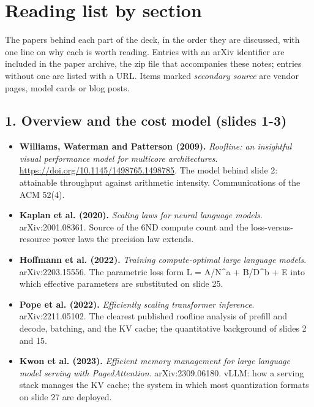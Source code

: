\documentclass[11pt,letterpaper]{article}
\begin{document}
\section{Reading list by section}
\label{app:reading}
The papers behind each part of the deck, in the order they are discussed, with one line on why each is worth reading. Entries with an arXiv identifier are included in the paper archive, the zip file that accompanies these notes; entries without one are listed with a URL. Items marked \emph{secondary source} are vendor pages, model cards or blog posts.

\subsection*{1. Overview and the cost model (slides 1-3)}
\begin{itemize}[leftmargin=1.2em,itemsep=3pt]\sloppy
\item \textbf{Williams, Waterman and Patterson (2009).} \textit{Roofline: an insightful visual performance model for multicore architectures}. \url{https://doi.org/10.1145/1498765.1498785}. The model behind slide 2: attainable throughput against arithmetic intensity. Communications of the ACM 52(4).
\item \textbf{Kaplan et al. (2020).} \textit{Scaling laws for neural language models}. arXiv:2001.08361. Source of the 6ND compute count and the loss-versus-resource power laws the precision law extends.
\item \textbf{Hoffmann et al. (2022).} \textit{Training compute-optimal large language models}. arXiv:2203.15556. The parametric loss form L = A/N\^{}a + B/D\^{}b + E into which effective parameters are substituted on slide 25.
\item \textbf{Pope et al. (2022).} \textit{Efficiently scaling transformer inference}. arXiv:2211.05102. The clearest published roofline analysis of prefill and decode, batching, and the KV cache; the quantitative background of slides 2 and 15.
\item \textbf{Kwon et al. (2023).} \textit{Efficient memory management for large language model serving with PagedAttention}. arXiv:2309.06180. vLLM: how a serving stack manages the KV cache; the system in which most quantization formats on slide 27 are deployed.
\end{itemize}
\end{document}
